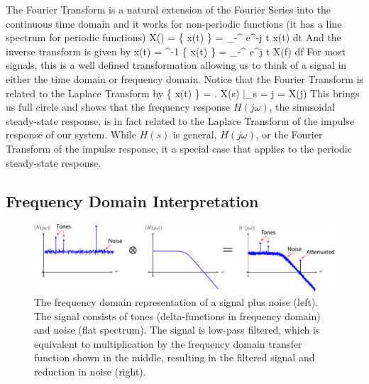 The Fourier Transform is a natural extension of the Fourier Series into the continuous time domain and it works for non-periodic functions (it has a line spectrum for periodic functions)
\be
	X(\omega)  =  \left\{ x(t) \right\} =  \int_{-\infty}^{\infty} e^{-j \omega t} x(t) dt
\ee
And the inverse transform is given by
\be
	x(t) =  ^{-1} \left\{ x(t) \right\} = \int_{-\infty}^{\infty} e^{j \omega t} X(f) df
\ee
For most signals, this is a well defined transformation allowing us to think of a signal in either the time domain or frequency domain. Notice that the Fourier Transform is related to the Laplace Transform by
\be
	  \left\{ x(t) \right\}  = \left. X(s) \right|_{s = j\omega}  = X(j\omega)
\ee
This brings us full circle and shows that the frequency response $H(j\omega)$, the sinusoidal steady-state response, is in fact related to the Laplace Transform of the impulse response of our system.  While $H(s)$ is general, $H(j\omega)$, or the Fourier Transform of the impulse response, it a special case that applies to the periodic steady-state response.  




\subsection{Frequency Domain Interpretation}



\begin{figure}[tb]
\begin{center}
\includegraphics[width=\columnwidth]{sig_noise_freq.pdf}
\end{center}
\caption{The frequency domain representation of a signal plus noise (left).  The signal consists of tones (delta-functions in frequency domain) and noise (flat spectrum).  The signal is low-pass filtered, which is equivalent to multiplication by the frequency domain transfer function shown in the middle, resulting in the filtered signal and reduction in noise (right).  } \label{fig:freq_domain}
\end{figure}

